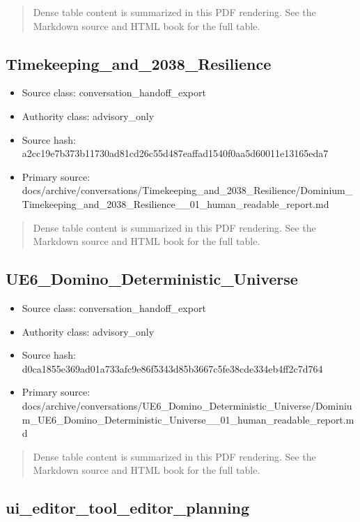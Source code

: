 \documentclass[11pt,a4paper]{report}
\begin{document}
\begin{quote}\small Dense table content is summarized in this PDF rendering. See the Markdown source and HTML book for the full table.\end{quote}

\subsection{Timekeeping\_and\_2038\_Resilience}

\begin{itemize}
\item Source class: conversation\_handoff\_export
\item Authority class: advisory\_only
\item Source hash: a2cc19e7b373b11730ad81cd26c55d487eaffad1540f0aa5d60011e13165eda7
\item Primary source: docs/archive/conversations/Timekeeping\_and\_2038\_Resilience/Dominium\_Timekeeping\_and\_2038\_Resilience\_\_01\_human\_readable\_report.md
\end{itemize}

\begin{quote}\small Dense table content is summarized in this PDF rendering. See the Markdown source and HTML book for the full table.\end{quote}

\subsection{UE6\_Domino\_Deterministic\_Universe}

\begin{itemize}
\item Source class: conversation\_handoff\_export
\item Authority class: advisory\_only
\item Source hash: d0ca1855e369ad01a733afc9e86f5343d85b3667c5fe38cde334eb4ff2c7d764
\item Primary source: docs/archive/conversations/UE6\_Domino\_Deterministic\_Universe/Dominium\_UE6\_Domino\_Deterministic\_Universe\_\_01\_human\_readable\_report.md
\end{itemize}

\begin{quote}\small Dense table content is summarized in this PDF rendering. See the Markdown source and HTML book for the full table.\end{quote}

\subsection{ui\_editor\_tool\_editor\_planning}
\end{document}

